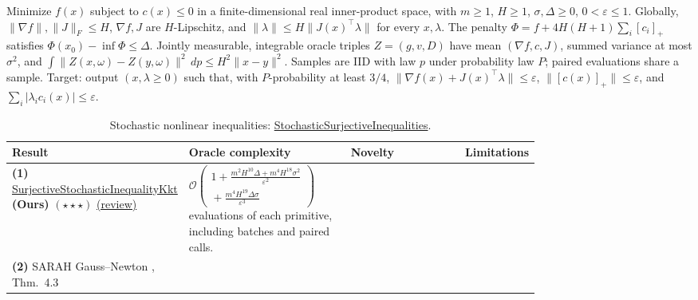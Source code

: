 \begin{table}[tp]
\centering
\caption{Stochastic nonlinear inequalities: \href{https://github.com/k3nfalt/longtails/blob/main/LongTails/Setups/StochasticSurjectiveInequalities.lean}{StochasticSurjectiveInequalities}.}\label{tab:StochasticSurjectiveInequalities}
\parbox{\linewidth}{\footnotesize Minimize $f(x)$ subject to $c(x)\le0$ in a finite-dimensional real inner-product space, with $m\ge1$, $H\ge1$, $\sigma,\Delta\ge0$, $0<\varepsilon\le1$. Globally, $\|\nabla f\|,\|J\|_F\le H$, $\nabla f,J$ are $H$-Lipschitz, and $\|\lambda\|\le H\|J(x)^\top\lambda\|$ for every $x,\lambda$. The penalty $\Phi=f+4H(H+1)\sum_i[c_i]_+$ satisfies $\Phi(x_0)-\inf\Phi\le\Delta$. Jointly measurable, integrable oracle triples $Z=(g,v,D)$ have mean $(\nabla f,c,J)$, summed variance at most $\sigma^2$, and $\int\|Z(x,\omega)-Z(y,\omega)\|^2\,dp\le H^2\|x-y\|^2$. Samples are IID with law $p$ under probability law $P$; paired evaluations share a sample. Target: output $(x,\lambda\ge0)$ such that, with $P$-probability at least $3/4$, $\|\nabla f(x)+J(x)^\top\lambda\|\le\varepsilon$, $\|[c(x)]_+\|\le\varepsilon$, and $\sum_i|\lambda_i c_i(x)|\le\varepsilon$.}\par\smallskip
\begin{threeparttable}
\footnotesize
\setlength{\tabcolsep}{4pt}\renewcommand{\arraystretch}{1.25}
\begin{tabularx}{\linewidth}{@{}>{\raggedright\arraybackslash}p{0.20\linewidth}>{\raggedright\arraybackslash}p{0.32\linewidth}>{\raggedright\arraybackslash}p{0.25\linewidth}>{\raggedright\arraybackslash}X@{}}
\toprule
\textbf{Result} & \textbf{Oracle complexity} & \textbf{Novelty} & \textbf{Limitations} \\
\midrule
\textbf{(1)} \href{https://github.com/k3nfalt/longtails/blob/main/LongTails/Theorems/SurjectiveStochasticInequalityKkt.lean}{Surjective\allowbreak Stochastic\allowbreak Inequality\allowbreak Kkt} \textbf{(Ours)} $(\star\star\star)$ \href{https://github.com/k3nfalt/longtails/blob/main/scripts/reviews/SurjectiveStochasticInequalityKkt.md}{(review)}
& $\mathcal{O}\!\left(\begin{gathered}1+\frac{m^2H^{10}\Delta+m^4H^{18}\sigma^2}{\varepsilon^2}\\{}+\frac{m^4H^{19}\Delta\sigma}{\varepsilon^3}\end{gathered}\right)$ evaluations of each primitive, including batches and paired calls. & & \\
\midrule[1.2pt]
\textbf{(2)} SARAH Gauss--Newton \citep{ssiTranDinh2020}, Thm.~4.3

\end{tabularx}
\end{threeparttable}
\end{table}
